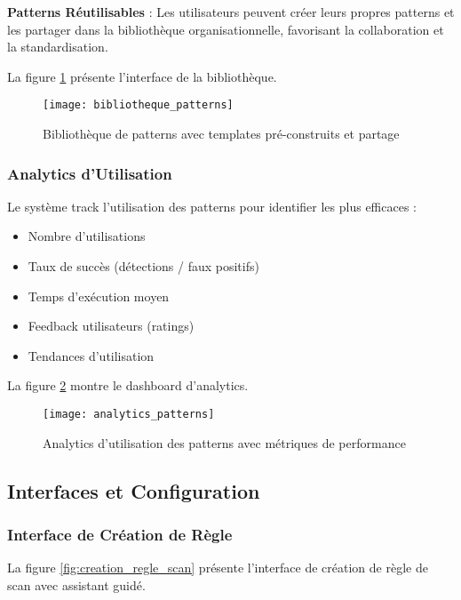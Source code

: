 \textbf{Patterns Réutilisables} : Les utilisateurs peuvent créer leurs propres patterns et les partager dans la bibliothèque organisationnelle, favorisant la collaboration et la standardisation.

La figure \ref{fig:bibliotheque_patterns} présente l'interface de la bibliothèque.

\begin{figure}[htpb]
\centering
\texttt{[image: bibliotheque\_patterns]}
\caption{Bibliothèque de patterns avec templates pré-construits et partage}
\label{fig:bibliotheque_patterns}
\end{figure}

\subsubsection{Analytics d'Utilisation}

Le système track l'utilisation des patterns pour identifier les plus efficaces :
\begin{itemize}
    \item Nombre d'utilisations
    \item Taux de succès (détections / faux positifs)
    \item Temps d'exécution moyen
    \item Feedback utilisateurs (ratings)
    \item Tendances d'utilisation
\end{itemize}

La figure \ref{fig:analytics_patterns} montre le dashboard d'analytics.

\begin{figure}[htpb]
\centering
\texttt{[image: analytics\_patterns]}
\caption{Analytics d'utilisation des patterns avec métriques de performance}
\label{fig:analytics_patterns}
\end{figure}

\subsection{Interfaces et Configuration}

\subsubsection{Interface de Création de Règle}

La figure \ref{fig:creation_regle_scan} présente l'interface de création de règle de scan avec assistant guidé.

